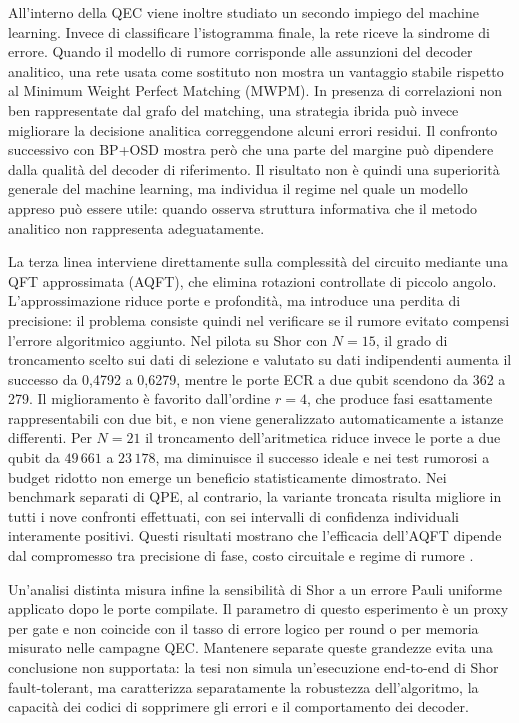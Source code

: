 \begin{onehalfspace}
All'interno della QEC viene inoltre studiato un secondo impiego del machine learning.
Invece di classificare l'istogramma finale, la rete riceve la sindrome di errore. Quando
il modello di rumore corrisponde alle assunzioni del decoder analitico, una rete usata
come sostituto non mostra un vantaggio stabile rispetto al Minimum Weight Perfect
Matching (MWPM). In presenza di correlazioni non ben rappresentate dal grafo del
matching, una strategia ibrida può invece migliorare la decisione analitica
correggendone alcuni errori residui. Il confronto successivo con BP+OSD mostra però che
una parte del margine può dipendere dalla qualità del decoder di riferimento. Il
risultato non è quindi una superiorità generale del machine learning, ma individua il
regime nel quale un modello appreso può essere utile: quando osserva struttura
informativa che il metodo analitico non rappresenta adeguatamente.

La terza linea interviene direttamente sulla complessità del circuito mediante una QFT
approssimata (AQFT), che elimina rotazioni controllate di piccolo angolo.
L'approssimazione riduce porte e profondità, ma introduce una perdita di precisione: il
problema consiste quindi nel verificare se il rumore evitato compensi l'errore
algoritmico aggiunto. Nel pilota su Shor con \(N = 15\), il grado di troncamento scelto sui
dati di selezione e valutato su dati indipendenti aumenta il successo da 0,4792 a
0,6279, mentre le porte ECR a due qubit scendono da 362 a 279. Il miglioramento è
favorito dall'ordine \(r = 4\), che produce fasi esattamente rappresentabili con due bit, e
non viene generalizzato automaticamente a istanze differenti. Per \(N = 21\) il troncamento
dell'aritmetica riduce invece le porte a due qubit da \(49\,661\) a \(23\,178\), ma diminuisce il
successo ideale e nei test rumorosi a budget ridotto non emerge un beneficio
statisticamente dimostrato. Nei benchmark separati di QPE, al contrario, la variante
troncata risulta migliore in tutti i nove confronti effettuati, con sei intervalli di
confidenza individuali interamente positivi. Questi risultati mostrano che l'efficacia
dell'AQFT dipende dal compromesso tra precisione di fase, costo circuitale e regime di
rumore \cite{akoramurthy2026}.

Un'analisi distinta misura infine la sensibilità di Shor a un errore Pauli uniforme
applicato dopo le porte compilate. Il parametro di questo esperimento è un proxy per
gate e non coincide con il tasso di errore logico per round o per memoria misurato nelle
campagne QEC. Mantenere separate queste grandezze evita una conclusione non supportata:
la tesi non simula un'esecuzione end-to-end di Shor fault-tolerant, ma caratterizza
separatamente la robustezza dell'algoritmo, la capacità dei codici di sopprimere gli
errori e il comportamento dei decoder.


\end{onehalfspace}
